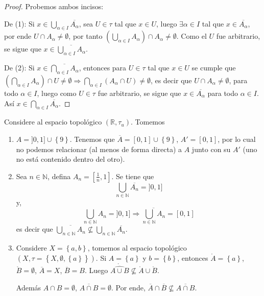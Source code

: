 \documentclass[12pt]{report}
\theoremstyle{largebreak}
\newcommand{\Int}[1]{\ensuremath{\mathring{#1}}}
\newcommand{\Cls}[1]{\ensuremath{\overline{#1}}}
\begin{document}
    \begin{proof}
        Probemos ambos incisos:
        
        De (1): Si $x\in \bigcup_{\alpha\in I}\Cls{A_\alpha}$, sea $U\in\tau$ tal que $x\in U$, luego $\exists \alpha\in I$ tal que $x\in \Cls{A_\alpha}$, por ende $U\cap A_\alpha\neq\emptyset$, por tanto $\left(\bigcup_{\alpha\in I}A_\alpha\right)\cap A_\alpha\neq\emptyset$. Como el $U$ fue arbitrario, se sigue que $x\in\Cls{\bigcup_{\alpha\in I}A_\alpha}$.

        De (2): Si $x\in \Cls{\bigcap_{\alpha\in I}A_\alpha}$, entonces para $U\in\tau$ tal que $x\in U$ se cumple que $\left(\bigcap_{\alpha\in I}A_\alpha\right)\cap U\neq\emptyset\Rightarrow\bigcap_{\alpha\in I}\left(A_\alpha\cap U \right)\neq\emptyset$, es decir que $U\cap A_\alpha\neq\emptyset$, para todo $\alpha\in I$, luego como $U\in\tau$ fue arbitrario, se sigue que $x\in \Cls{A_\alpha}$ para todo $\alpha\in I$. Así $x\in\bigcap_{\alpha\in I}\Cls{A_\alpha}$. 
    \end{proof}

    \begin{exa}
        Considere al espacio topológico $(\mathbb{R},\tau_u)$. Tomemos
        \begin{enumerate}
            \item $A=]0,1]\cup\left\{9\right\}$. Tenemos que $\Cls{A}=[0,1]\cup\left\{9\right\}$, $A'=[0,1]$, por lo cual no podemos relacionar (al menos de forma directa) a $A$ junto con su $A'$ (uno no está contenido dentro del otro).
            \item Sea $n\in\mathbb{N}$, defina $A_n=[\frac{1}{n},1]$. Se tiene que
            \begin{equation*}
                \bigcup_{n\in\mathbb{N}}\Cls{A_n}=]0,1]
            \end{equation*}
            y,
            \begin{equation*}
                \bigcup_{n\in\mathbb{N}}A_n=]0,1]\Rightarrow \Cls{\bigcup_{n\in\mathbb{N}}A_n}=[0,1]
            \end{equation*}
            es decir que $\Cls{\bigcup_{n\in\mathbb{N}}A_n}\nsubseteq\bigcup_{n\in\mathbb{N}}\Cls{A_n}$.
            \item Considere $X=\left\{a,b\right\}$, tomemos al espacio topológico $(X,\tau=\left\{X,\emptyset,\left\{a\right\} \right\})$. Si $A=\left\{a\right\}$ y $b=\left\{b\right\}$, entonces $\Int{A}=\left\{a\right\}$, $\Int{B}=\emptyset$, $\Cls{A}=X$, $\Cls{B}=B$. Luego $\Int{\widehat{A\cup B}}\nsubseteq \Int{A}\cup\Int{B}$.
            
            Además $A\cap B=\emptyset$, $\Cls{A\cap B}=\emptyset$. Por ende, $\Cls{A}\cap \Cls{B}\nsubseteq\Cls{A\cap B}$.
        \end{enumerate}
    \end{exa}
\end{document}
